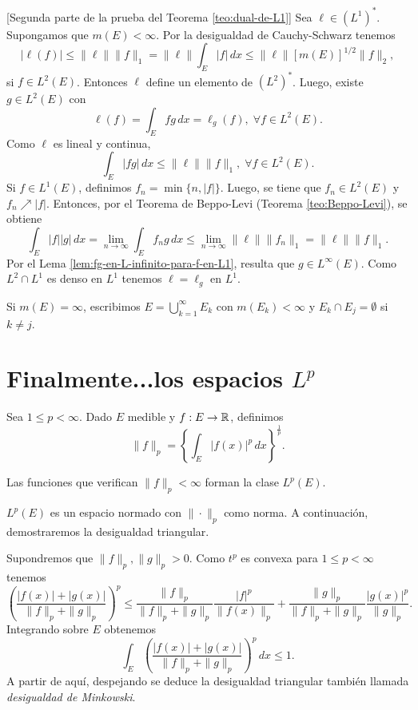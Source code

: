 \begin{demo}{}[Segunda parte de la prueba del Teorema \ref{teo:dual-de-L1}]
Sea $\ell \in (L^1)^*$. Supongamos que $m(E)<\infty$.
Por la desigualdad de Cauchy-Schwarz tenemos
\[
|\ell(f)|\leq \|\ell\|\|f\|_1=\|\ell\| \int_E |f|\,dx 
\leq \|\ell\| \left[m(E)\right]^{1/2}\|f\|_2, 
\]
si $f \in L^2(E)$.
Entonces $\ell$ define un elemento de $(L^2)^*$. Luego, existe $g \in L^2(E)$ con 
\[
\ell(f)=\int_E fg\,dx=\ell_g(f), \;\forall f \in L^2(E).
\]
Como $\ell$ es lineal y continua, 
\[
\int_E |fg|\,dx \leq \|\ell\| \|f\|_1, \;\forall f \in L^2(E).
\]
Si $f \in L^1(E)$, definimos $f_n=\min\{n, |f|\}$. Luego,  se tiene que $f_n \in L^2(E)$ y $f_n \nearrow |f|$. Entonces, por el Teorema de Beppo-Levi (Teorema \ref{teo:Beppo-Levi}), se obtiene
\[
\int_E |f| |g|\,dx =\lim\limits_{n \to \infty} \int_E f_n g\,dx 
\leq \lim\limits_{n \to \infty} \|\ell\| \|f_n\|_1
=\|\ell\| \|f\|_1.\]
Por el Lema \ref{lem:fg-en-L-infinito-para-f-en-L1}, resulta que $g \in L^{\infty}(E)$.
Como $L^2 \cap L^1$ es denso en $L^1$ tenemos $\ell=\ell_g$ en $L^1$.

Si $m(E)=\infty$, escribimos $E=\bigcup\limits_{k=1}^{\infty} E_k$
con $m(E_k)<\infty$ y $E_k \cap E_j=\emptyset$ si $k \neq j$.
\end{demo}





\section{Finalmente...los espacios $L^p$}

Sea $1\leq p<\infty$.  Dado $E$ medible y $f:E\to \mathbb{R}$, definimos 
\[
\|f\|_p=\left\{ \int_E |f(x)|^p\,dx \right\}^{\frac{1}{p}}.
\]

Las funciones que verifican $\|f\|_p<\infty$ forman la clase $L^p(E)$.

$L^p(E)$ es un espacio normado con $\|\cdot \|_p$ como norma. A  continuaci\'on, demostraremos la desigualdad triangular. 

Supondremos que $\|f\|_p,\|g\|_p>0$. Como $t^p$ es convexa para $1\leq p <\infty$ tenemos 
\[
\left( \frac{|f(x)|+|g(x)|}{\|f\|_p+\|g\|_p}   \right)^p \leq 
\frac{\|f\|_p}{\|f\|_p+\|g\|_p} \frac{|f|^p}{\|f(x)\|_p}+  
\frac{\|g\|_p}{\|f\|_p+\|g\|_p} \frac{|g(x)|^p}{\|g\|_p}.
\]
Integrando sobre $E$ obtenemos
\[
\int_E \left(\frac{|f(x)|+|g(x)|}{\|f\|_p+\|g\|_p}\right)^p \,dx\leq 1.
\]
A partir de aqu\'i, despejando se deduce la desigualdad triangular tambi\'en llamada \emph{desigualdad de Minkowski}.

